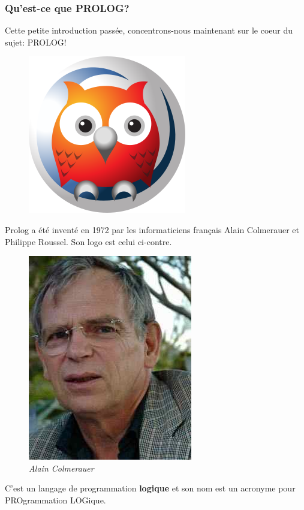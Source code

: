 \documentclass[a4paper, 12pt]{article}
\numberwithin{equation}{subsection}
\begin{document}
\subsubsection{Qu'est-ce que PROLOG?}
Cette petite introduction passée, concentrons-nous maintenant sur le coeur du sujet: PROLOG! \\
\begin{figure}
  \includegraphics[scale=0.3]{imgs/swi-prolog.png}
\end{figure}

Prolog a été inventé en 1972 par les informaticiens français Alain Colmerauer et Philippe Roussel. Son logo est celui ci-contre.\\
\begin{figure}
  \includegraphics[scale=0.5]{imgs/AlainColmerauer.jpeg}
  \caption{{\em Alain Colmerauer}}
\end{figure}

C'est un langage de programmation {\bf logique} et son nom est un acronyme pour PROgrammation LOGique. \\
\end{document}
